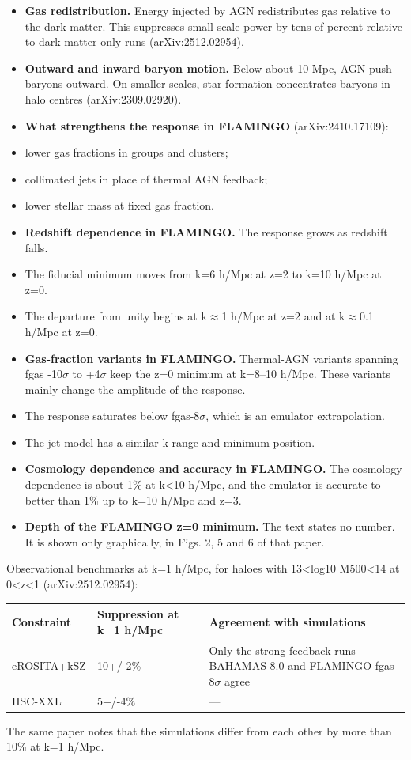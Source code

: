 \documentclass[11pt,a4paper]{article}
\begin{document}
\begin{itemize}
  \item \textbf{Gas redistribution.} Energy injected by AGN redistributes gas relative to the dark matter. This suppresses small-scale power by tens of percent relative to dark-matter-only runs (arXiv:2512.02954).
  \item \textbf{Outward and inward baryon motion.} Below about 10 Mpc, AGN push baryons outward. On smaller scales, star formation concentrates baryons in halo centres (arXiv:2309.02920).
  \item \textbf{What strengthens the response in FLAMINGO} (arXiv:2410.17109):
  \item lower gas fractions in groups and clusters;
  \item collimated jets in place of thermal AGN feedback;
  \item lower stellar mass at fixed gas fraction.
  \item \textbf{Redshift dependence in FLAMINGO.} The response grows as redshift falls.
  \item The fiducial minimum moves from k=6 h/Mpc at z=2 to k=10 h/Mpc at z=0.
  \item The departure from unity begins at k$\approx$1 h/Mpc at z=2 and at k$\approx$0.1 h/Mpc at z=0.
  \item \textbf{Gas-fraction variants in FLAMINGO.} Thermal-AGN variants spanning fgas -10$\sigma$ to +4$\sigma$ keep the z=0 minimum at k=8--10 h/Mpc. These variants mainly change the amplitude of the response.
  \item The response saturates below fgas-8$\sigma$, which is an emulator extrapolation.
  \item The jet model has a similar k-range and minimum position.
  \item \textbf{Cosmology dependence and accuracy in FLAMINGO.} The cosmology dependence is about 1\% at k\textless{}10 h/Mpc, and the emulator is accurate to better than 1\% up to k=10 h/Mpc and z=3.
  \item \textbf{Depth of the FLAMINGO z=0 minimum.} The text states no number. It is shown only graphically, in Figs. 2, 5 and 6 of that paper.
\end{itemize}
Observational benchmarks at k=1 h/Mpc, for haloes with 13\textless{}log10 M500\textless{}14 at 0\textless{}z\textless{}1 (arXiv:2512.02954):

\begin{longtable}{@{}p{}p{}p{}@{}}
\toprule
\textbf{Constraint} & \textbf{Suppression at k=1 h/Mpc} & \textbf{Agreement with simulations} \\ \midrule \endhead
eROSITA+kSZ & 10+/-2\% & Only the strong-feedback runs BAHAMAS 8.0 and FLAMINGO fgas-8$\sigma$ agree \\
HSC-XXL & 5+/-4\% & --- \\
\bottomrule\end{longtable}
The same paper notes that the simulations differ from each other by more than 10\% at k=1 h/Mpc.
\end{document}
